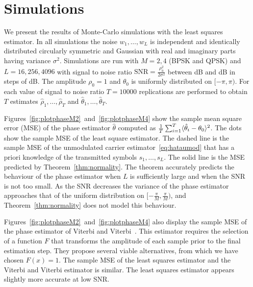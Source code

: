 \documentclass{article}
\begin{document}
\vspace{-0.1cm}
\section{Simulations}\label{sec:simulations}
\vspace{-0.1cm}
We present the results of Monte-Carlo simulations with the least squares estimator.  In all simulations the noise $w_1,\dots,w_L$ is independent and identically distributed circularly symmetric and Gaussian with real and imaginary parts having variance $\sigma^2$.  Simulations are run with $M=2,4$ (BPSK and QPSK) and $L=16,256,4096$ with signal to noise ratio $\text{SNR} = \tfrac{\rho_0^2}{2\sigma^2}$ between \unit[-20]{dB} and \unit[20]{dB} in steps of \unit[1]{dB}.  The amplitude $\rho_0=1$ and $\theta_0$ is uniformly distributed on $[-\pi, \pi)$.  For each value of signal to noise ratio $T = 10000$ replications are performed to obtain $T$ estimates $\hat{\rho}_1, \dots, \hat{\rho}_T$ and $\hat{\theta}_1, \dots, \hat{\theta}_T$.  

Figures~\ref{fig:plotphaseM2}~and~\ref{fig:plotphaseM4} show the sample mean square error (MSE) of the phase estimator $\hat{\theta}$ computed as $\tfrac{1}{T}\sum_{i=1}^T\langle \hat{\theta}_i - \theta_0 \rangle^2$.  The dots show the sample MSE of the least square estimator.  The dashed line is the sample MSE of the unmodulated carrier estimator~\eqref{eq:hataumod} that has a priori knowledge of the transmitted symbols $s_1, \dots, s_L$.  %
The solid line is the MSE predicted by Theorem~\ref{thm:normality}.  The theorem accurately predicts the behaviour of the phase estimator when $L$ is sufficiently large and when the SNR is not too small.  As the SNR decreases the variance of the phase estimator approaches that of the uniform distribution on $[-\tfrac{\pi}{M}, \tfrac{\pi}{M})$, and Theorem~\ref{thm:normality} does not model this behaviour.  %

Figures~\ref{fig:plotphaseM2}~and~\ref{fig:plotphaseM4} also display the sample MSE of the phase estimator of Viterbi and Viterbi~\cite{ViterbiViterbi_phase_est_1983}.  This estimator requires the selection of a function $F$ that transforms the amplitude of each sample prior to the final estimation step.  %
They propose several viable alternatives, from which we have chosen $F(x) = 1$.  The sample MSE of the least squares estimator and the Viterbi and Viterbi estimator is similar.  The least squares estimator appears slightly more accurate at low SNR.
\end{document}
